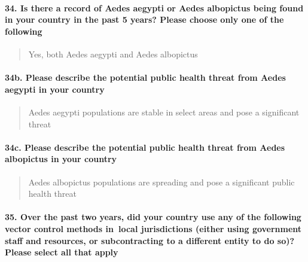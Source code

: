 \documentclass[
]{article}
\begin{document}
\hypertarget{is-there-a-record-of-aedes-aegypti-or-aedes-albopictus-being-found-in-your-country-in-the-past-5-years-please-choose-only-one-of-the-following}{%
\paragraph{34. Is there a record of Aedes aegypti or Aedes albopictus
being found in your country in the past 5 years? Please choose only one
of the
following}\label{is-there-a-record-of-aedes-aegypti-or-aedes-albopictus-being-found-in-your-country-in-the-past-5-years-please-choose-only-one-of-the-following}}

\begin{quote}
Yes, both Aedes aegypti and Aedes albopictus
\end{quote}

\hypertarget{b.-please-describe-the-potential-public-health-threat-from-aedes-aegypti-in-your-country}{%
\paragraph{34b. Please describe the potential public health threat from
Aedes aegypti in your
country}\label{b.-please-describe-the-potential-public-health-threat-from-aedes-aegypti-in-your-country}}

\begin{quote}
Aedes aegypti populations are stable in select areas and pose a
significant threat
\end{quote}

\hypertarget{c.-please-describe-the-potential-public-health-threat-from-aedes-albopictus-in-your-country}{%
\paragraph{34c. Please describe the potential public health threat from
Aedes albopictus in your
country}\label{c.-please-describe-the-potential-public-health-threat-from-aedes-albopictus-in-your-country}}

\begin{quote}
Aedes albopictus populations are spreading and pose a significant public
health threat
\end{quote}

\hypertarget{over-the-past-two-years-did-your-country-use-any-of-the-following-vector-control-methods-in-local-jurisdictions-either-using-government-staff-and-resources-or-subcontracting-to-a-different-entity-to-do-so-please-select-all-that-apply}{%
\paragraph{35. Over the past two years, did your country use any of the
following vector control methods in~local jurisdictions (either using
government staff and resources, or subcontracting to a different entity
to do so)? Please select all that
apply}\label{over-the-past-two-years-did-your-country-use-any-of-the-following-vector-control-methods-in-local-jurisdictions-either-using-government-staff-and-resources-or-subcontracting-to-a-different-entity-to-do-so-please-select-all-that-apply}}
\end{document}
